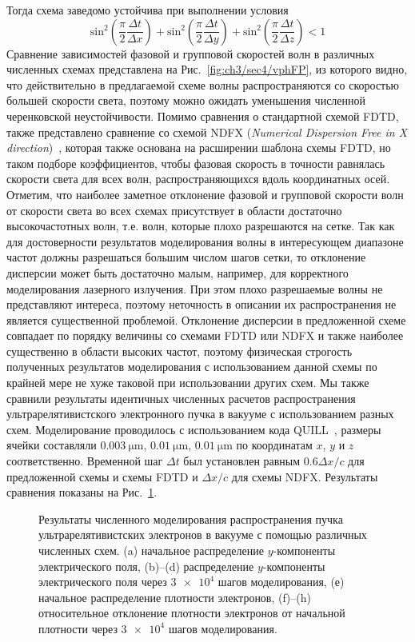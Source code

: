 Тогда схема заведомо устойчива при выполнении условия
\begin{equation}
    \text{sin}^2 \left( \frac{\pi}{2} \frac{\Delta t}{\Delta x} \right) + \text{sin}^2 \left( \frac{\pi}{2} \frac{\Delta t}{\Delta y} \right) + \text{sin}^2 \left( \frac{\pi}{2} \frac{\Delta t}{\Delta z} \right) < 1
\end{equation}
Сравнение зависимостей фазовой и групповой скоростей волн в различных численных схемах представлена на Рис.~\ref{fig:ch3/sec4/vphFP}, из которого видно, что действительно в предлагаемой схеме волны распространяются со скоростью большей скорости света, поэтому можно ожидать уменьшения численной черенковской неустойчивости.
Помимо сравнения о стандартной схемой FDTD, также представлено сравнение со схемой NDFX (\textit{Numerical Dispersion Free in X direction})~\cite{NDFX}, которая также основана на расширении шаблона схемы FDTD, но таком подборе коэффициентов, чтобы фазовая скорость в точности равнялась скорости света для всех волн, распространяющихся вдоль координатных осей. 
Отметим, что наиболее заметное отклонение фазовой и групповой скорости волн от скорости света во всех схемах присутствует в области достаточно высокочастотных волн, т.е. волн, которые плохо разрешаются на сетке.
Так как для достоверности результатов моделирования волны в интересующем диапазоне частот должны разрешаться большим числом шагов сетки, то отклонение дисперсии может быть достаточно малым, например, для корректного моделирования лазерного излучения.
При этом плохо разрешаемые волны не представляют интереса, поэтому неточность в описании их распространения не является существенной проблемой.
Отклонение дисперсии в предложенной схеме совпадает по порядку величины со схемами FDTD или NDFX и также наиболее существенно в области высоких частот, поэтому физическая строгость полученных результатов моделирования с использованием данной схемы по крайней мере не хуже таковой при использовании других схем.
Мы также сравнили результаты идентичных численных расчетов распространения ультрарелятивистского электронного пучка в вакууме с использованием разных схем.
Моделирование проводилось с использованием кода QUILL~\cite{QUILL}, размеры ячейки составляли $\SI{0.003}{\um}$, $\SI{0.01}{\um}$, $\SI{0.01}{\um}$ по координатам $x$, $y$ и $z$ соответственно.
Временной шаг $\Delta t$ был установлен равным $0.6\Delta x/c$ для предложенной схемы и схемы FDTD и $\Delta x/c$ для схемы NDFX.
Результаты сравнения показаны на Рис.~\ref{fig:ch3/PIC}.
\begin{figure}[ht]
    \caption[Сравнение результатов численного моделирования распространения пучка ультрарелятивистских электронов в вакууме с помощью различных численных схем]{Результаты численного моделирования распространения пучка ультрарелятивистских электронов в вакууме с помощью различных численных схем. (a) начальное распределение $y$-компоненты электрического поля, (b)--(d) распределение $y$-компоненты электрического поля через $\num{3e4}$ шагов моделирования, (е) начальное распределение плотности электронов, (f)--(h) относительное отклонение плотности электронов от начальной плотности через $\num{3e4}$ шагов моделирования.
    \label{fig:ch3/PIC}}
\end{figure}
